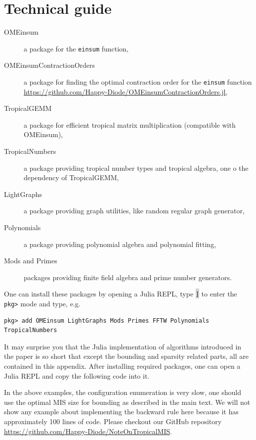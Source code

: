 \documentclass[onefignum, onetabnum]{siamart190516}
\newcommand{\<}{\langle}
\renewcommand{\>}{\rangle}
\newcounter{example}
\begin{document}
\section{Technical guide}\label{sec:technical}
\begin{description}
	\item[OMEinsum] a package for the \texttt{einsum} function,
	\item[OMEinsumContractionOrders] a package for finding the optimal contraction order for the \texttt{einsum} function \\ \href{https://github.com/Happy-Diode/OMEinsumContractionOrders.jl}{https://github.com/Happy-Diode/OMEinsumContractionOrders.jl},
	\item[TropicalGEMM] a package for efficient tropical matrix multiplication (compatible with OMEinsum),
	\item[TropicalNumbers] a package providing tropical number types and tropical algebra, one o the dependency of TropicalGEMM,
	\item[LightGraphs] a package providing graph utilities, like random regular graph generator,
	\item[Polynomials] a package providing polynomial algebra and polynomial fitting,
	\item[Mods and Primes] packages providing finite field algebra and prime number generators.
\end{description}

One can install these packages by opening a Julia REPL, type \colorbox{lightgray}{\texttt{]}} to enter the \texttt{pkg>} mode and type, e.g.
\begin{lstlisting}
pkg> add OMEinsum LightGraphs Mods Primes FFTW Polynomials TropicalNumbers
\end{lstlisting}

It may surprise you that the Julia implementation of algorithms introduced in the paper is so short that except the bounding and sparsity related parts,
all are contained in this appendix. After installing required packages, one can open a Julia REPL and copy the following code into it.



In the above examples, the configuration enumeration is very slow, one should use the optimal MIS size for bounding as described in the main text.
We will not show any example about implementing the backward rule here because it has approximately 100 lines of code.
Please checkout our GitHub repository \href{https://github.com/Happy-Diode/NoteOnTropicalMIS}{https://github.com/Happy-Diode/NoteOnTropicalMIS}.
\end{document}
